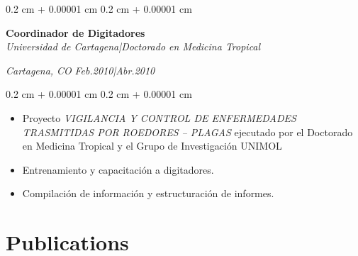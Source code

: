 \documentclass[10pt, letterpaper]{article}
\newenvironment{highlights}{
    \begin{itemize}[
        topsep=0.10 cm,
        parsep=0.10 cm,
        partopsep=0pt,
        itemsep=0pt,
        leftmargin=0.4 cm + 10pt
    ]
}{
    \end{itemize}
} %
\newenvironment{onecolentry}{
    \begin{adjustwidth}{
        0.2 cm + 0.00001 cm
    }{
        0.2 cm + 0.00001 cm
    }
}{
    \end{adjustwidth}
} %
\newenvironment{twocolentry}[2][]{
    \onecolentry
    \def\secondColumn{#2}
    \setcolumnwidth{\fill, 4.5 cm}
    \begin{paracol}{2}
}{
    \switchcolumn \raggedleft \secondColumn
    \end{paracol}
    \endonecolentry
} %
\begin{document}
        \begin{twocolentry}{
            \textit{Cartagena, CO}
            \textit{Feb.2010|Abr.2010}}
            \textbf{Coordinador de Digitadores}\\
            \textit{Universidad de Cartagena|Doctorado en Medicina Tropical}
        \end{twocolentry}
        \vspace{0.10 cm}
        \begin{onecolentry}
            \begin{highlights}
                \item Proyecto \emph{VIGILANCIA Y CONTROL DE ENFERMEDADES TRASMITIDAS POR ROEDORES – PLAGAS} ejecutado por el Doctorado en Medicina Tropical y el Grupo de Investigación UNIMOL
                \item Entrenamiento y capacitación a digitadores.
                \item Compilación de información y estructuración de informes.
            \end{highlights}
        \end{onecolentry}
        \vspace{0.2 cm}




    
    \section{Publications}
\end{document}
